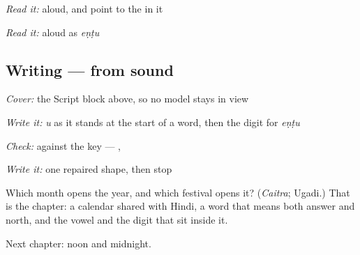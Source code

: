 \emph{Read it:} \textbf{} aloud, and point to the  in it

\emph{Read it:} \textbf{} aloud as \emph{eṇṭu}

\subsection*{Writing — from sound}
\emph{Cover:} the Script block above, so no model stays in view

\emph{Write it:} \emph{u} as it stands at the start of a word, then the digit for \emph{eṇṭu}

\emph{Check:} against the key — \textbf{}, \textbf{}

\emph{Write it:} one repaired shape, then stop

\begin{tcolorbox}[breakable,colback=teal!4,colframe=teal!35!black,title={Before you move on}]
Which month opens the year, and which festival opens it? (\emph{Caitra}; Ugadi.) That is the chapter: a calendar shared with Hindi, a word that means both answer and north, and the vowel and the digit that sit inside it.

Next chapter: noon and midnight.
\end{tcolorbox}
